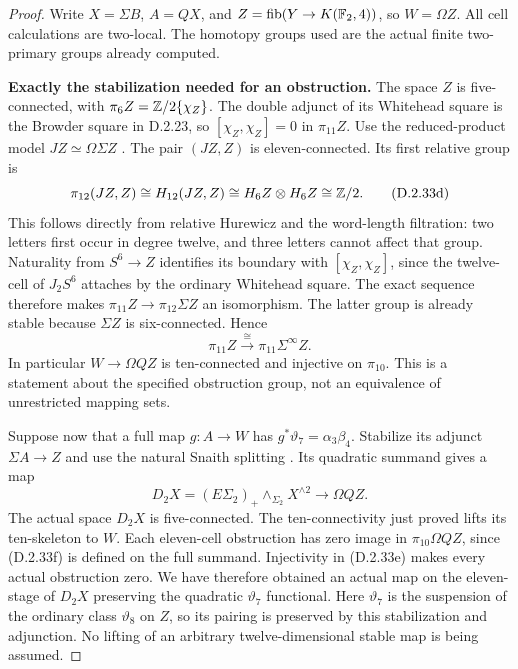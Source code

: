 \begin{proof}
Write $X=\Sigma B$, $A=QX$, and
$Z=\operatorname{fib}(Y\to K(\mathbb F_2,4))$, so $W=\Omega Z$.
All cell calculations are two-local. The homotopy groups used
are the actual finite two-primary groups already computed.

\medskip\noindent
\textbf{Exactly the stabilization needed for an obstruction.}
The space $Z$ is five-connected, with
$\pi_6Z=\mathbb Z/2\{\chi_Z\}$. The double adjunct of its
Whitehead square is the Browder square in \textup{D.2.23},
so $[\chi_Z,\chi_Z]=0$ in $\pi_{11}Z$.
Use the reduced-product model $JZ\simeq\Omega\Sigma Z$
\cite[Section~1 and Theorem~5.6]{I_James1955}.
The pair $(JZ,Z)$ is eleven-connected. Its first relative
group is
\[
 \pi_{12}(JZ,Z)\cong H_{12}(JZ,Z)
       \cong H_6Z\otimes H_6Z\cong\mathbb Z/2.
 \tag{D.2.33d}
\]
This follows directly from relative Hurewicz and the
word-length filtration: two letters first occur in degree
twelve, and three letters cannot affect that group.
Naturality from $S^6\to Z$ identifies its boundary with
$[\chi_Z,\chi_Z]$, since the twelve-cell of $J_2S^6$
attaches by the ordinary Whitehead square. The exact sequence
therefore makes $\pi_{11}Z\to\pi_{12}\Sigma Z$ an
isomorphism. The latter group is already stable because
$\Sigma Z$ is six-connected. Hence
\[
 \pi_{11}Z\xrightarrow{\ \cong\ }
       \pi_{11}\Sigma^\infty Z.
 \tag{D.2.33e}
\]
In particular $W\to\Omega QZ$ is ten-connected and
injective on $\pi_{10}$. This is a statement about the
specified obstruction group, not an equivalence of
unrestricted mapping sets.

Suppose now that a full map $g:A\to W$ has
$g^*\vartheta_7=\alpha_3\beta_4$. Stabilize its adjunct
$\Sigma A\to Z$ and use the natural Snaith splitting
\cite[Theorem~1.1 and Section~2]{Snaith1974}. Its quadratic
summand gives a map
\[
       D_2X=(E\Sigma_2)_+\wedge_{\Sigma_2}X^{\wedge2}
                       \longrightarrow\Omega QZ.
 \tag{D.2.33f}
\]
The actual space $D_2X$ is five-connected. The ten-connectivity
just proved lifts its ten-skeleton to $W$. Each eleven-cell
obstruction has zero image in $\pi_{10}\Omega QZ$, since
\textup{(D.2.33f)} is defined on the full summand.
Injectivity in \textup{(D.2.33e)} makes every actual obstruction
zero. We have therefore obtained an actual map on the eleven-stage
of $D_2X$ preserving the quadratic $\vartheta_7$ functional.
Here $\vartheta_7$ is the suspension of the ordinary class
$\vartheta_8$ on $Z$, so its pairing is preserved by this
stabilization and adjunction. No lifting of an arbitrary
twelve-dimensional stable map is being assumed.


\end{proof}
